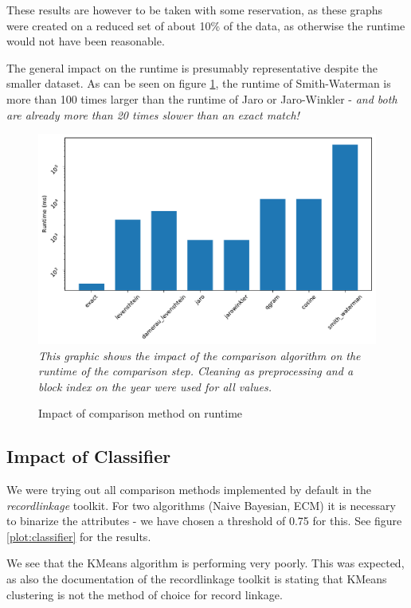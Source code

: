 \documentclass[sigconf,nonacm]{acmart}
\begin{document}
These results are however to be taken with some reservation, as these
graphs were created on a reduced set of about 10\% of the data, as otherwise
the runtime would not have been reasonable.

The general impact on the runtime is presumably representative despite the
smaller dataset.
As can be seen on figure \ref{plot:comparison2}, the runtime of Smith-Waterman
is more than 100 times larger than the runtime of Jaro or Jaro-Winkler
- \emph{and both are already more than 20 times slower than an exact match!}

\begin{figure}[h]
\centering
\caption{Impact of comparison method on runtime}
\label{plot:comparison2}
\includegraphics[width=0.9\linewidth]{../figures/debug_eval_comparison2}\\[-2mm]
\emph{\small
This graphic shows the impact of the comparison algorithm on the
runtime of the comparison step.
Cleaning as preprocessing and a block index on the year were used for all values.}
\end{figure}

\subsection{Impact of Classifier}

We were trying out all comparison methods implemented by default in the
\emph{recordlinkage} toolkit.
For two algorithms (Naive Bayesian, ECM) it is necessary to binarize
the attributes - we have chosen a threshold of 0.75 for this.
See figure \ref{plot:classifier} for the results.

We see that the KMeans algorithm is performing very poorly.
This was expected, as also the documentation of the recordlinkage toolkit
is stating that KMeans clustering is not the method of choice for record
linkage.
\end{document}
